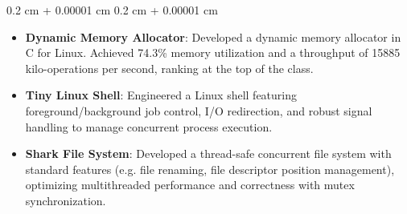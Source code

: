 \documentclass[10pt, letterpaper]{article}
\newenvironment{highlights}{
    \begin{itemize}[
        topsep=0.10 cm,
        parsep=0.10 cm,
        partopsep=0pt,
        itemsep=0pt,
        leftmargin=0.4 cm + 10pt
    ]
}{
    \end{itemize}
} %
\newenvironment{onecolentry}{
    \begin{adjustwidth}{
        0.2 cm + 0.00001 cm
    }{
        0.2 cm + 0.00001 cm
    }
}{
    \end{adjustwidth}
} %
\newenvironment{twocolentry}[2][]{
    \onecolentry
    \def\secondColumn{#2}
    \setcolumnwidth{\fill, 4.5 cm}
    \begin{paracol}{2}
}{
    \switchcolumn \raggedleft \secondColumn
    \end{paracol}
    \endonecolentry
} %
\begin{document}
        \vspace{0.10 cm}
        \begin{onecolentry}
            \begin{highlights}
                \item \textbf{Dynamic Memory Allocator}: Developed a dynamic memory allocator in C for Linux. Achieved 74.3\% memory utilization and a throughput of 15885 kilo-operations per second, ranking at the top of the class.
                \item \textbf{Tiny Linux Shell}: Engineered a Linux shell featuring foreground/background job control, I/O redirection, and robust signal handling to manage concurrent process execution.
                \item \textbf{Shark File System}: Developed a thread-safe concurrent file system with standard features (e.g. file renaming, file descriptor position management), optimizing multithreaded performance and correctness with mutex synchronization.
            \end{highlights}
        \end{onecolentry}

\end{document}
